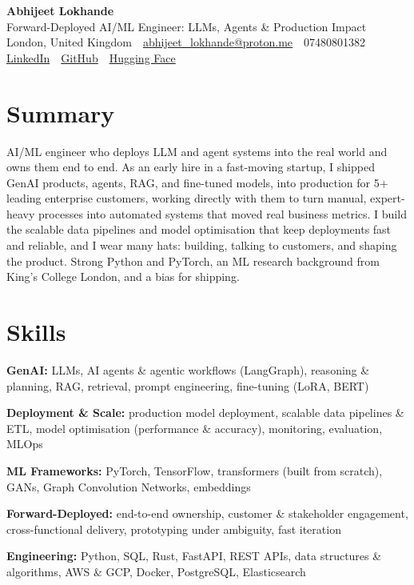 \documentclass[10pt,a4paper]{article}
\newcommand{\sep}{\,\textcolor{accent!60}{\textbar}\,}
\begin{document}
\begin{center}
  {\fontsize{24}{26}\selectfont\bfseries Abhijeet Lokhande}\\[3pt]
  {\color{accent}\large Forward-Deployed AI/ML Engineer: LLMs, Agents \& Production Impact}\\[5pt]
  {\small
    London, United Kingdom \sep
    \href{mailto:abhijeet_lokhande@proton.me}{abhijeet\_lokhande@proton.me} \sep
    07480801382 \\[2pt]
    \href{https://www.linkedin.com/in/ablds/}{LinkedIn} \sep
    \href{https://github.com/abhijeetscode}{GitHub} \sep
    \href{https://huggingface.co/ab-ai}{Hugging Face}
  }
\end{center}
\vspace{2pt}

\section{Summary}
AI/ML engineer who deploys LLM and agent systems into the real world and owns them end to end. As an early hire in a fast-moving startup, I shipped GenAI products, agents, RAG, and fine-tuned models, into production for 5+ leading enterprise customers, working directly with them to turn manual, expert-heavy processes into automated systems that moved real business metrics. I build the scalable data pipelines and model optimisation that keep deployments fast and reliable, and I wear many hats: building, talking to customers, and shaping the product. Strong Python and PyTorch, an ML research background from King's College London, and a bias for shipping.

\section{Skills}
\begin{tight}
  \item[\textcolor{accent}{\small$\bullet$}] \textbf{GenAI:} LLMs, AI agents \& agentic workflows (LangGraph), reasoning \& planning, RAG, retrieval, prompt engineering, fine-tuning (LoRA, BERT)
  \item[\textcolor{accent}{\small$\bullet$}] \textbf{Deployment \& Scale:} production model deployment, scalable data pipelines \& ETL, model optimisation (performance \& accuracy), monitoring, evaluation, MLOps
  \item[\textcolor{accent}{\small$\bullet$}] \textbf{ML Frameworks:} PyTorch, TensorFlow, transformers (built from scratch), GANs, Graph Convolution Networks, embeddings
  \item[\textcolor{accent}{\small$\bullet$}] \textbf{Forward-Deployed:} end-to-end ownership, customer \& stakeholder engagement, cross-functional delivery, prototyping under ambiguity, fast iteration
  \item[\textcolor{accent}{\small$\bullet$}] \textbf{Engineering:} Python, SQL, Rust, FastAPI, REST APIs, data structures \& algorithms, AWS \& GCP, Docker, PostgreSQL, Elasticsearch
\end{tight}
\end{document}
